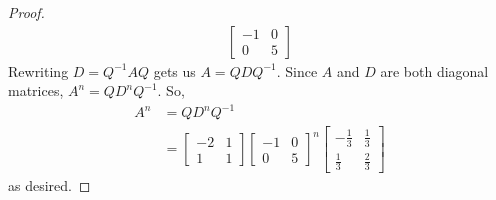 \documentclass[11pt]{scrartcl}
\begin{document}
\begin{proof}
\begin{align*}
\begin{bmatrix}
			-1 & 0 \\ 0&5
		\end{bmatrix}
	\end{align*}
	Rewriting $ D = Q^{-1} A Q $ gets us $ A = QDQ^{-1}$. Since $A$ and $D$ are both diagonal matrices,
	$ A^n = Q D^n Q^{-1}$.
	So,
	\begin{align*}
		A^n & = Q D^n Q^{-1} \\
		    & =
		\begin{bmatrix}
			-2 & 1 \\
			1  & 1
		\end{bmatrix}
		\begin{bmatrix}
			-1 & 0 \\ 0&5
		\end{bmatrix}^n
		\begin{bmatrix}-\frac{1}{3}&\frac{1}{3}\\ \frac{1}{3}&\frac{2}{3}\end{bmatrix}
	\end{align*}
	as desired.
\end{proof}

\end{document}
